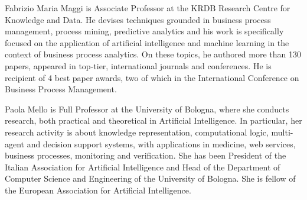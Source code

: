 \documentclass[10pt,journal,compsoc]{IEEEtran}
\theoremstyle{definition}
\theoremstyle{plain}
\begin{document}
\begin{IEEEbiography}{Fabrizio Maria Maggi}
is Associate Professor at the KRDB Research Centre for Knowledge and Data. He devises techniques grounded in business process management, process mining, predictive analytics and his work is specifically focused on the application of artificial intelligence and machine learning in the context of business process analytics. On these topics, he authored more than 130 papers, appeared in top-tier, international journals and conferences. He is recipient of 4 best paper awards, two of which in the International Conference on Business Process Management. 
\end{IEEEbiography}

\begin{IEEEbiography}{Paola Mello}
is Full Professor at the University of Bologna, where she conducts research, both practical and theoretical in Artificial Intelligence. In particular, her research activity is  about knowledge representation, computational logic, multi-agent and  decision support systems, with applications in medicine, web services, business processes, monitoring and verification.  She has been President of the Italian Association for Artificial Intelligence and Head of the Department of Computer Science and Engineering of the University of Bologna. She is fellow of the European Association for Artificial Intelligence.
\end{IEEEbiography}
\end{document}
